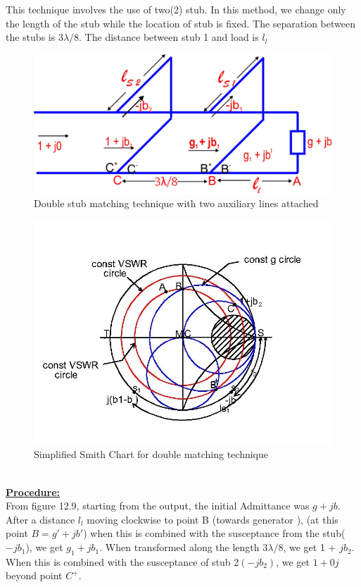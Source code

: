 This technique involves the use of two(2) stub. In this method, we change only the length of the stub while the location of stub is fixed. The separation between the stubs is $ 3\lambda/8$. The distance between stub 1 and load is $l_l$%
\begin{figure}[h]
\centering
\includegraphics[width=1\linewidth]{./graphics/fig12}
\caption{Double stub matching technique with two auxiliary lines attached}
\end{figure}
\begin{figure}[h]
\centering
\includegraphics[width=1\linewidth]{./graphics/dousmith}
\caption{Simplified Smith Chart for double matching technique}
\end{figure}\\
\underline{\textbf{Procedure:} } \\

From figure 12.9, starting from the output, the initial Admittance was $g + jb$. After a distance $l_l$ moving clockwise to point B (towards generator ), (at this point $B = g' + jb'$) when this is combined with the susceptance from the stub($-jb_1$), we get $g_1 +jb_1$. When transformed along the length $3\lambda/8$, we get 1 + $jb_2$. When this is combined with the susceptance of stub 2$(-jb_2)$, we get $1 + 0j$ beyond point $C^+$.\\

